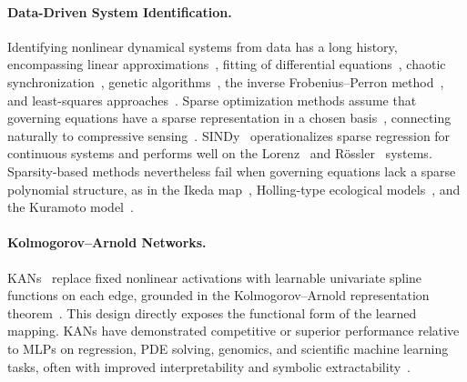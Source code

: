 \documentclass{article}
\begin{document}
\paragraph{Data-Driven System Identification.} Identifying nonlinear dynamical systems from data has a long history\cite{FS1987, CM1987, Casdagli1989, SGMCPW1990, GS1990, HKS1999, Bollt2000, YB2007, WYLKG2011a, WLGY2011b, SWL2012b, SWFDL2014}, encompassing linear approximations~\cite{FS1987, Gouesbet1991, Sauer1994_PRL}, fitting of differential equations~\cite{BBBB1992}, chaotic synchronization~\cite{Parlitz1996}, genetic algorithms~\cite{Szpiro1997, TZJ2007}, the inverse Frobenius--Perron method~\cite{Bollt2000}, and least-squares approaches~\cite{YB2007}. Sparse optimization methods assume that governing equations have a sparse representation in a chosen basis~\cite{WYLKG2011a, YLG2012}, connecting naturally to compressive sensing~\cite{Candes2008Introduction, Baraniuk2007Compressed, Donoho2006Compressed, Candes2006Stable, Candes2006Robust}. SINDy~\cite{sindy} operationalizes sparse regression for continuous systems and performs well on the Lorenz~\cite{lorenz1963deterministic} and R\"{o}ssler~\cite{Rossler1976} systems. Sparsity-based methods nevertheless fail when governing equations lack a sparse polynomial structure, as in the Ikeda map~\cite{Ikeda1979, HJM1985}, Holling-type ecological models~\cite{Holling1959a, Holling1959b, JHSLGHL2018}, and the Kuramoto model~\cite{Kuramoto1975SelfEntrapment, Basiri2025SINDyG}.


\paragraph{Kolmogorov--Arnold Networks.} KANs~\cite{liu2025kan} replace fixed nonlinear activations with learnable univariate spline functions on each edge, grounded in the Kolmogorov--Arnold representation theorem~\cite{Kolmogorov1957, Arnold2009_Kolmogorov}. This design directly exposes the functional form of the learned mapping. KANs have demonstrated competitive or superior performance relative to MLPs on regression, PDE solving, genomics, and scientific machine learning tasks, often with improved interpretability and symbolic extractability~\cite{coxkan2025, oxfordgenomicskan2025, naturegraphkan2025, scidirectkan2025, liu2025kan}. 
\end{document}
